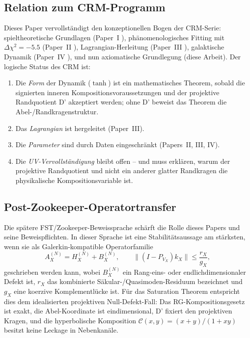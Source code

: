 \documentclass[aps,prd,twocolumn,superscriptaddress,nofootinbib]{revtex4-2}
\begin{document}
\subsection{Relation zum CRM-Programm}

Dieses Paper vervollständigt den konzeptionellen Bogen der CRM-Serie: spieltheoretische Grundlagen (Paper~I \cite{Geiger2026}), phänomenologisches Fitting mit $\Delta\chi^2 = -5.5$ (Paper~II \cite{Geiger2026b}), Lagrangian-Herleitung (Paper~III \cite{Geiger2026c}), galaktische Dynamik (Paper~IV \cite{Geiger2026d}), und nun axiomatische Grundlegung (diese Arbeit). Der logische Status des CRM ist:
\begin{enumerate}
\item Die \textit{Form} der Dynamik ($\tanh$) ist ein mathematisches Theorem, sobald die signierten inneren Kompositionsvoraussetzungen und der projektive Randquotient D' akzeptiert werden; ohne D' beweist das Theorem die Abel-/Randkragenstruktur.
\item Das \textit{Lagrangian} ist hergeleitet (Paper~III).
\item Die \textit{Parameter} sind durch Daten eingeschränkt (Papers~II, III, IV).
\item Die \textit{UV-Vervollständigung} bleibt offen -- und muss erklären, warum der projektive Randquotient und nicht ein anderer glatter Randkragen die physikalische Kompositionsvariable ist.
\end{enumerate}

\subsection{Post-Zookeeper-Operatortransfer}

Die spätere FST/Zookeeper-Beweissprache schärft die Rolle dieses
Papers und seine Beweispflichten.  In dieser Sprache ist eine
Stabilitätsaussage am stärksten, wenn sie als Galerkin-kompatible
Operatorfamilie
\[
  A_X^{(N)} = H_X^{(N)} + B_X^{(N)}, \qquad
  \|(I-P_{V_X})k_X\| \leq \frac{r_X}{g_X},
\]
geschrieben werden kann, wobei $B_X^{(N)}$ ein Rang-eins- oder
endlichdimensionaler Defekt ist, $r_X$ das kombinierte
Säkular-/Quasimoden-Residuum bezeichnet und $g_X$ eine koerzive
Komplementlücke ist.  Für das Saturation Theorem entspricht dies dem
idealisierten projektiven Null-Defekt-Fall: Das RG-Kompositionsgesetz ist exakt, die
Abel-Koordinate ist eindimensional, D' fixiert den projektiven Kragen, und die hyperbolische Komposition
$\mathcal{C}(x,y)=(x+y)/(1+xy)$ besitzt keine Leckage in Nebenkanäle.
\end{document}
